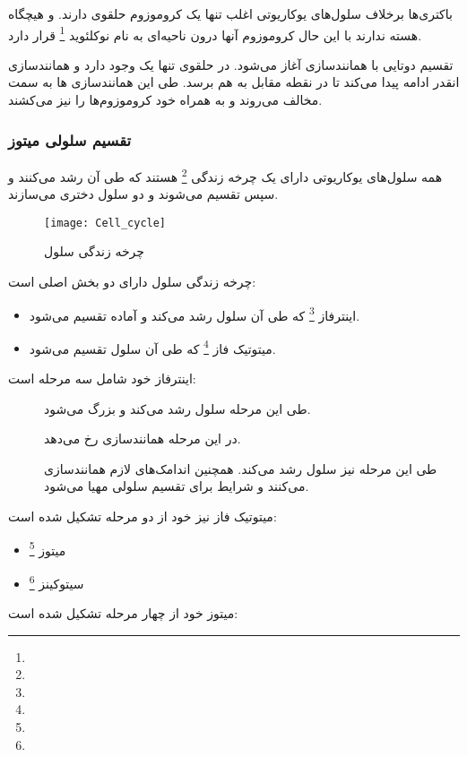باکتری‌ها برخلاف سلول‌های یوکاریوتی اغلب تنها یک کروموزوم حلقوی دارند. و هیچگاه هسته ندارند با این حال کروموزوم آنها درون ناحیه‌ای به نام نوکلئوید
\footnote{}
قرار دارد.

تقسیم دوتایی با همانندسازی
آغاز می‌شود. در
حلقوی تنها یک
وجود دارد و همانندسازی انقدر ادامه پیدا می‌کند تا در نقطه مقابل به هم برسد. طی این همانندسازی
ها به سمت مخالف می‌روند و به همراه خود کروموزوم‌ها را نیز می‌کشند.

\pagebreak
\subsubsection{تقسیم سلولی میتوز}
همه سلول‌های یوکاریوتی دارای یک چرخه زندگی
\footnote{}
 هستند که طی آن رشد می‌کنند و سپس تقسیم می‌شوند و دو سلول دختری می‌سازند.

\begin{wrapfigure}[12]{l}{7cm}
	\centering
	\texttt{[image: Cell\_cycle]}
	\caption{ چرخه زندگی سلول}
	\label{figure:cellCycle}
\end{wrapfigure}

چرخه زندگی سلول دارای دو بخش اصلی است:
\begin{itemize}
\item اینترفاز
\footnote{}
که طی آن سلول رشد می‌کند و آماده تقسیم می‌شود.
\item میتوتیک فاز
\footnote{}
که طی آن سلول تقسیم می‌شود.
\end{itemize}

اینترفاز خود شامل سه مرحله است:
\begin{description}
\item[]
طی این مرحله سلول رشد می‌کند و بزرگ می‌شود.
\item[]
در این مرحله همانندسازی
رخ می‌دهد.
\item[]
طی این مرحله نیز سلول رشد می‌کند. همچنین اندامک‌های لازم همانندسازی می‌کنند و شرایط برای تقسیم سلولی مهیا می‌شود.
\end{description}

میتوتیک فاز نیز خود از دو مرحله تشکیل شده است:
\begin{itemize}
\item میتوز
\footnote{}
\item سیتوکینز
\footnote{}
\end{itemize}

\bigskip
\bigskip
\bigskip
میتوز خود از چهار مرحله تشکیل شده است:

